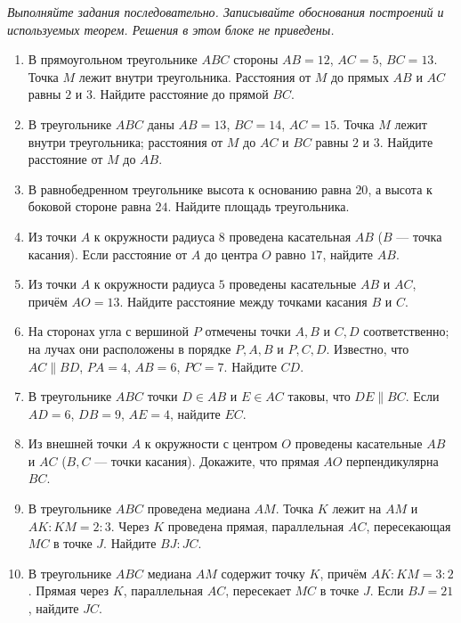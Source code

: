 \documentclass[a4paper,12pt]{article}
\newcommand{\sect}[1]{\vspace{2mm}{\Large\bfseries\color{darkaccent}#1}\par\vspace{1mm}{\color{accent!55}\rule{\linewidth}{0.55pt}}\par\vspace{1mm}}
\begin{document}
\sect{Тренировочный блок. Путь А --- 10 заданий}
\textit{Выполняйте задания последовательно. Записывайте обоснования построений и используемых теорем. Решения в этом блоке не приведены.}

\begin{enumerate}[itemsep=7pt]
\item В прямоугольном треугольнике $ABC$ стороны $AB=12$, $AC=5$, $BC=13$. Точка $M$ лежит внутри треугольника. Расстояния от $M$ до прямых $AB$ и $AC$ равны $2$ и $3$. Найдите расстояние до прямой $BC$.
\item В треугольнике $ABC$ даны $AB=13$, $BC=14$, $AC=15$. Точка $M$ лежит внутри треугольника; расстояния от $M$ до $AC$ и $BC$ равны $2$ и $3$. Найдите расстояние от $M$ до $AB$.
\item В равнобедренном треугольнике высота к основанию равна $20$, а высота к боковой стороне равна $24$. Найдите площадь треугольника.
\item Из точки $A$ к окружности радиуса $8$ проведена касательная $AB$ ($B$ --- точка касания). Если расстояние от $A$ до центра $O$ равно $17$, найдите $AB$.
\item Из точки $A$ к окружности радиуса $5$ проведены касательные $AB$ и $AC$, причём $AO=13$. Найдите расстояние между точками касания $B$ и $C$.
\item На сторонах угла с вершиной $P$ отмечены точки $A,B$ и $C,D$ соответственно; на лучах они расположены в порядке $P,A,B$ и $P,C,D$. Известно, что $AC\parallel BD$, $PA=4$, $AB=6$, $PC=7$. Найдите $CD$.
\item В треугольнике $ABC$ точки $D\in AB$ и $E\in AC$ таковы, что $DE\parallel BC$. Если $AD=6$, $DB=9$, $AE=4$, найдите $EC$.
\item Из внешней точки $A$ к окружности с центром $O$ проведены касательные $AB$ и $AC$ ($B,C$ --- точки касания). Докажите, что прямая $AO$ перпендикулярна $BC$.
\item В треугольнике $ABC$ проведена медиана $AM$. Точка $K$ лежит на $AM$ и $AK:KM=2:3$. Через $K$ проведена прямая, параллельная $AC$, пересекающая $MC$ в точке $J$. Найдите $BJ:JC$.
\item В треугольнике $ABC$ медиана $AM$ содержит точку $K$, причём $AK:KM=3:2$. Прямая через $K$, параллельная $AC$, пересекает $MC$ в точке $J$. Если $BJ=21$, найдите $JC$.
\end{enumerate}
\clearpage
\end{document}
